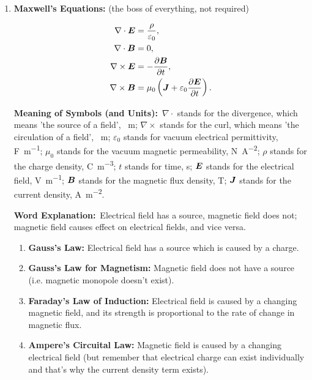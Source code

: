 \documentclass[8pt]{article}
\newcommand{\MeanSymb}{\textbf{Meaning of Symbols (and Units):}\ }
\newcommand{\WordExpl}{\textbf{Word Explanation:}\ }
\newcommand{\Note}{\textbf{Note:}\ }
\begin{document}
\begin{enumerate}
                \Note It represents the directional energy flux (the energy transfer per unit area per unit time), and demostrates why electromagnetic wave is a transverse wave. 
                
                \item \textbf{Maxwell's Equations:} (the boss of everything, not required)
                
                \begin{align*}
                    \nabla \cdot \boldsymbol{E} &= \frac{\rho}{\varepsilon_0},\\
                    \nabla \cdot \boldsymbol{B} &= 0,\\
                    \nabla \times \boldsymbol{E} &= - \frac{\partial \boldsymbol{B}}{\partial t},\\
                    \nabla \times \boldsymbol{B} &= \mu_0 \left(\boldsymbol{J} + \varepsilon_0 \frac{\partial \boldsymbol{E}}{\partial t}\right).
                \end{align*}

                \MeanSymb \(\nabla \cdot\) stands for the divergence, which means 'the source of a field', \unit{\per\metre}; \(\nabla \times\) stands for the curl, which means 'the circulation of a field', \unit{\per\metre}; \(\varepsilon_0\) stands for vacuum electrical permittivity, \unit{\farad\per\metre}; \(\mu_0\) stands for the vacuum magnetic permeability, \unit{\newton \per \ampere \squared}; \(\rho\) stands for the charge density, \unit{\coulomb\per\metre\cubed}; \(t\) stands for time, \unit{\second}; \(\boldsymbol{E}\) stands for the electrical field, \unit{\volt\per\metre}; \(\boldsymbol{B}\) stands for the magnetic flux density, \unit{\tesla}; \(\boldsymbol{J}\) stands for the current density, \unit{\ampere\per\metre\squared}.

                \WordExpl Electrical field has a source, magnetic field does not; magnetic field causes effect on electrical fields, and vice versa.
                \begin{enumerate}
                    \item \textbf{Gauss's Law:} Electrical field has a source which is caused by a charge.
                    \item \textbf{Gauss's Law for Magnetism:} Magnetic field does not have a source (i.e. magnetic monopole doesn't exist).
                    \item \textbf{Faraday's Law of Induction:} Electrical field is caused by a changing magnetic field, and its strength is proportional to the rate of change in magnetic flux.
                    \item \textbf{Ampere's Circuital Law:} Magnetic field is caused by a changing electrical field (but remember that electrical charge can exist individually and that's why the current density term exists).
                \end{enumerate}


\end{enumerate}
\end{document}
